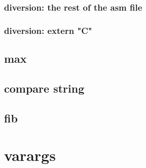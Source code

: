 

\subsubsection{diversion: the rest of the asm file}


\subsubsection{diversion: extern "C"}



\subsection{max}







\subsection{compare string}





\subsection{fib}





\section{varargs}



